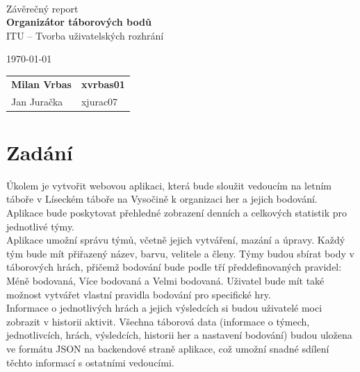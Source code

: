 \documentclass[a4paper, 12pt]{article} %
\begin{document}
\begin{titlepage}
    \begin{center}
         \\
        \Huge{Závěrečný report} \\
        \Large{\textbf{Organizátor táborových bodů}} \\
        \large{ITU – Tvorba uživatelských rozhrání }
    \end{center}

    {\large \today \hfill
        \large
        \begin{tabular}{l l}
        \textbf{Milan Vrbas} & \quad \textbf{xvrbas01}\\
        Jan Juračka           & \quad xjurac07      \\
        \end{tabular}
        }
\end{titlepage}

\tableofcontents
\thispagestyle{empty}
\newpage

\section{Zadání}
Úkolem je vytvořit webovou aplikaci, která bude sloužit vedoucím na letním táboře v 
Líseckém táboře na Vysočině k organizaci her a jejich bodování. Aplikace bude poskytovat 
přehledné zobrazení denních a celkových statistik pro jednotlivé týmy. \\
Aplikace umožní správu týmů, včetně jejich vytváření, mazání a úpravy. Každý tým bude mít 
přiřazený název, barvu, velitele a členy. Týmy budou sbírat body v táborových hrách, přičemž 
bodování bude podle tří předdefinovaných pravidel: Méně bodovaná, Více bodovaná a Velmi bodovaná. 
Uživatel bude mít také možnost vytvářet vlastní pravidla bodování pro specifické hry. \\
Informace o jednotlivých hrách a jejich výsledcích si budou uživatelé moci zobrazit v 
historii aktivit. Všechna táborová data (informace o týmech, jednotlivcích, 
hrách, výsledcích, historii her a nastavení bodování) budou uložena ve formátu JSON na 
backendové straně aplikace, což umožní snadné sdílení těchto informací s ostatními vedoucími.
\end{document}
